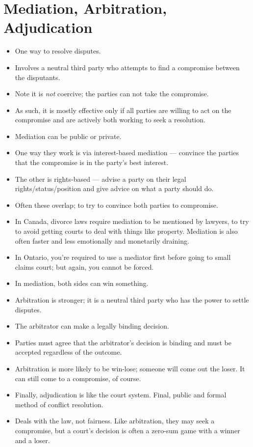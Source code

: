\documentclass{article}
\begin{document}
\section{Mediation, Arbitration, Adjudication}
\begin{itemize}
    \item One way to resolve disputes.
    \item Involves a neutral third party who attempts to find a compromise between the disputants.
    \item Note it is \emph{not} coercive; the parties can not take the compromise.
    \item As such, it is mostly effective only if all parties are willing to act on the compromise and are actively both working to seek a resolution.
    \item Mediation can be public or private.
    \item One way they work is via interest-based mediation --- convince the parties that the compromise is in the party's best interest.
    \item The other is rights-based --- advise a party on their legal rights/status/position and give advice on what a party should do.
    \item Often these overlap; to try to convince both parties to compromise.
    \item In Canada, divorce laws require mediation to be mentioned by lawyers, to try to avoid getting courts to deal with things like property.  Mediation is also often faster and less emotionally and monetarily draining.
    \item In Ontario, you're required to use a mediator first before going to small claims court; but again, you cannot be forced.
    \item In mediation, both sides can win something.
    \item Arbitration is stronger; it is a neutral third party who has the power to settle disputes.
    \item The arbitrator can make a legally binding decision.
    \item Parties must agree that the arbitrator's decision is binding and must be accepted regardless of the outcome.
    \item Arbitration is more likely to be win-lose; someone will come out the loser.  It can still come to a compromise, of course.
    \item Finally, adjudication is like the court system.  Final, public and formal method of conflict resolution.
    \item Deals with the law, not fairness.  Like arbitration, they may seek a compromise, but a court's decision is often a zero-sum game with a winner and a loser.
\end{itemize}
\end{document}
